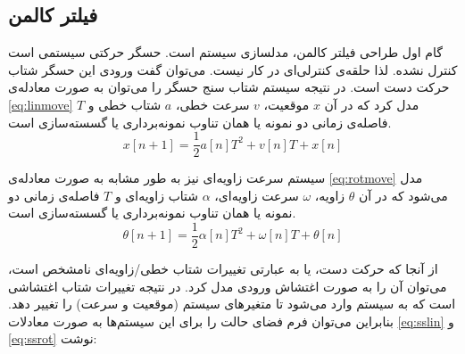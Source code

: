 \subsection{فیلتر کالمن} \label{sec:kal}
گام اول طراحی فیلتر کالمن، مدلسازی سیستم است. حسگر حرکتی سیستمی است کنترل نشده. لذا حلقه‌ی کنترلی‌ای در کار نیست. می‌توان گفت ورودی این حسگر شتاب حرکت دست است. در نتیجه سیستم شتاب سنج حسگر را می‌توان به صورت معادله‌ی \ref{eq:linmove} مدل کرد که در آن $x$ موقعیت، $v$ سرعت خطی، $a$ شتاب خطی و $T$ فاصله‌ی زمانی دو نمونه یا همان تناوب نمونه‌برداری یا گسسته‌سازی است.
\begin{equation}
	x[n+1] = \frac{1}{2}a[n]T^2 + v[n]T + x[n] 
	\label{eq:linmove}
\end{equation}

سیستم سرعت زاویه‌ای نیز به طور مشابه به صورت معادله‌ی \ref{eq:rotmove} مدل می‌شود که در آن $\theta$ زاویه، $\omega$ سرعت زاویه‌ای، $\alpha$ شتاب زاویه‌ای و $T$ فاصله‌ی زمانی دو نمونه یا همان تناوب نمونه‌برداری یا گسسته‌سازی است.
\begin{equation}
	\theta[n+1] = \frac{1}{2}\alpha[n]T^2 + \omega[n]T + \theta[n] 
	\label{eq:rotmove}
\end{equation}

از آنجا که حرکت دست، یا به عبارتی تغییرات شتاب خطی/زاویه‌ای نامشخص است، می‌توان آن را به صورت اغتشاش ورودی مدل کرد. در نتیجه تغییرات شتاب اغتشاشی است که به سیستم وارد می‌شود تا متغیرهای سیستم (موقعیت و سرعت) را تغییر دهد. بنابراین می‌توان فرم فضای حالت را برای این سیستم‌ها به صورت معادلات \ref{eq:sslin} و \ref{eq:ssrot} نوشت:

